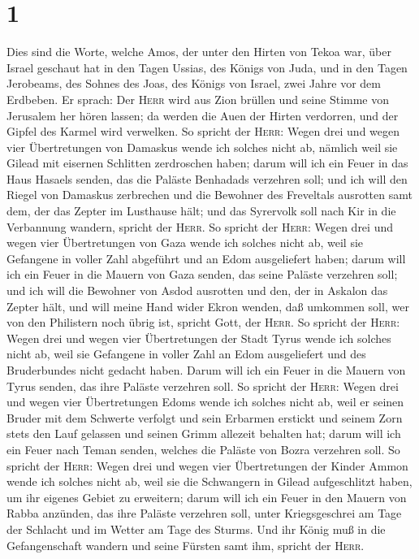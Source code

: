 \hypertarget{section}{%
\section{1}\label{section}}

 Dies sind die Worte, welche Amos, der unter den Hirten
von Tekoa war, über Israel geschaut hat in den Tagen Ussias, des Königs
von Juda, und in den Tagen Jerobeams, des Sohnes des Joas, des Königs
von Israel, zwei Jahre vor dem Erdbeben.  Er sprach: Der
\textsc{Herr} wird aus Zion brüllen und seine Stimme von Jerusalem her
hören lassen; da werden die Auen der Hirten verdorren, und der Gipfel
des Karmel wird verwelken.  So spricht der \textsc{Herr}:
Wegen drei und wegen vier Übertretungen von Damaskus wende ich solches
nicht ab, nämlich weil sie Gilead mit eisernen Schlitten zerdroschen
haben;  darum will ich ein Feuer in das Haus Hasaels
senden, das die Paläste Benhadads verzehren soll;  und ich
will den Riegel von Damaskus zerbrechen und die Bewohner des Freveltals
ausrotten samt dem, der das Zepter im Lusthause hält; und das Syrervolk
soll nach Kir in die Verbannung wandern, spricht der \textsc{Herr}.
 So spricht der \textsc{Herr}: Wegen drei und wegen vier
Übertretungen von Gaza wende ich solches nicht ab, weil sie Gefangene in
voller Zahl abgeführt und an Edom ausgeliefert haben; 
darum will ich ein Feuer in die Mauern von Gaza senden, das seine
Paläste verzehren soll;  und ich will die Bewohner von
Asdod ausrotten und den, der in Askalon das Zepter hält, und will meine
Hand wider Ekron wenden, daß umkommen soll, wer von den Philistern noch
übrig ist, spricht Gott, der \textsc{Herr}.  So spricht
der \textsc{Herr}: Wegen drei und wegen vier Übertretungen der Stadt
Tyrus wende ich solches nicht ab, weil sie Gefangene in voller Zahl an
Edom ausgeliefert und des Bruderbundes nicht gedacht haben.
 Darum will ich ein Feuer in die Mauern von Tyrus senden,
das ihre Paläste verzehren soll.  So spricht der
\textsc{Herr}: Wegen drei und wegen vier Übertretungen Edoms wende ich
solches nicht ab, weil er seinen Bruder mit dem Schwerte verfolgt und
sein Erbarmen erstickt und seinem Zorn stets den Lauf gelassen und
seinen Grimm allezeit behalten hat;  darum will ich ein
Feuer nach Teman senden, welches die Paläste von Bozra verzehren soll.
 So spricht der \textsc{Herr}: Wegen drei und wegen vier
Übertretungen der Kinder Ammon wende ich solches nicht ab, weil sie die
Schwangern in Gilead aufgeschlitzt haben, um ihr eigenes Gebiet zu
erweitern;  darum will ich ein Feuer in den Mauern von
Rabba anzünden, das ihre Paläste verzehren soll, unter Kriegsgeschrei am
Tage der Schlacht und im Wetter am Tage des Sturms.  Und
ihr König muß in die Gefangenschaft wandern und seine Fürsten samt ihm,
spricht der \textsc{Herr}.

